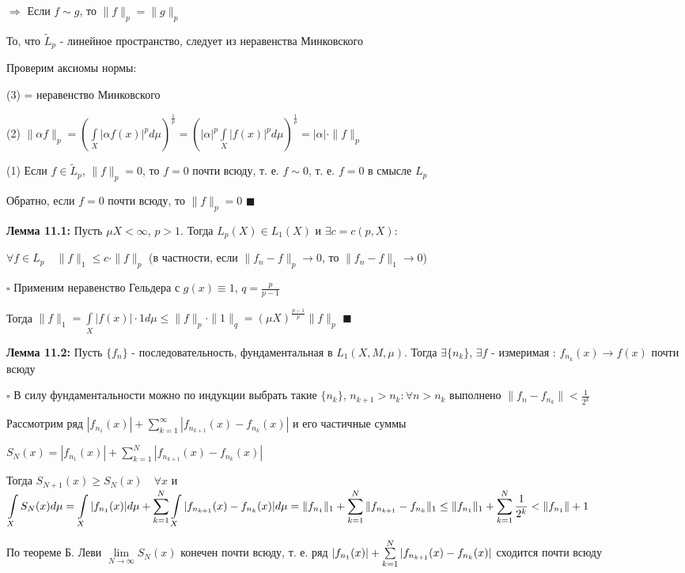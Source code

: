 \documentclass[a4paper]{report}
\newcommand*{\hm}[1]{#1\nobreak\discretionary{}%
            {\hbox{$\mathsurround=0pt #1$}}{}}
\begin{document}
$\Rightarrow$ Если $f\sim g$, то $\|f\|_p=\|g\|_p$

То, что $\tilde L_p$ - линейное пространство, следует из неравенства Минковского

Проверим аксиомы нормы:

(3) = неравенство Минковского

(2) $\|\alpha f\|_p=\left(\displaystyle\int\limits_X|\alpha f(x)|^pd\mu\right)^\frac1p=\left(|\alpha|^p\displaystyle\int\limits_X|f(x)|^pd\mu\right)^\frac1p=|\alpha|
\cdot\|f\|_p$

(1) Если $f\in\tilde L_p$, $\|f\|_p=0$, то $f=0$ почти всюду, т. е. $f\sim0$, т. е. $f=0$ в смысле $L_p$

Обратно, если $f=0$ почти всюду, то $\|f\|_p=0$ $\blacksquare$
\bigskip

\noindent\textbf{Лемма 11.1:} Пусть $\mu X<\infty$, $p>1$. Тогда $L_p(X)\in L_1(X)$ и $\exists c=c(p,X)\colon$

\noindent$\forall f\in L_p\quad\|f\|_1\le c\cdot\|f\|_p$ (в частности, если $\|f_n-f\|_p\to0$, то $\|f_n-f\|_1\to0$)

\noindent $\square$ Применим неравенство Гельдера с $g(x)\equiv1$, $q=\frac{p}{p-1}$

Тогда $\|f\|_1=\displaystyle\int\limits_X|f(x)|\cdot 1d\mu\le\|f\|_p\cdot\|1\|_q=(\mu X)^\frac{p-1}{p}\|f\|_p$ $\blacksquare$
\bigskip

\noindent\textbf{Лемма 11.2:} Пусть $\{f_n\}$ - последовательность, фундаментальная в $L_1(X,M,\mu)$. Тогда $\exists \{n_k\}$, $\exists f$ - измеримая : $f_{n_k}(x)\to f(x)$ почти всюду

\noindent $\square$ В силу фундаментальности можно по индукции выбрать такие $\{n_k\}$, $n_{k+1}>n_k\colon\forall n>n_k$ выполнено $\|f_n-f_{n_k}\|<\frac1{2^k}$

Рассмотрим ряд $|f_{n_1}(x)|+\sum\limits_{k=1}^\infty|f_{n_{k+1}}(x)-f_{n_k}(x)|$ и его частичные суммы

$S_N(x)=|f_{n_1}(x)|+\sum\limits_{k=1}^N|f_{n_{k+1}}(x)-f_{n_k}(x)|$

Тогда $S_{N+1}(x)\ge S_N(x)\quad\forall x$ и $\displaystyle\int\limits_X S_N(x)d\mu=\displaystyle\int\limits_X|f_{n_1}(x)|d\mu+\sum\limits_{k=1}^N\displaystyle\int\limits_X|f_{n_{k+1}}(x)\hm-f_{n_k}(x)|d\mu=\|f_{n_1}\|_1+\sum\limits_{k=1}^N\|f_{n_{k+1}}-f_{n_k}\|_1\le\|f_{n_1}\|_1+\sum\limits_{k=1}^N\frac1{2^k}<\|f_{n_1}\|+1$

По теореме Б. Леви $\lim\limits_{N\to\infty}S_N(x)$ конечен почти всюду, т. е. ряд $|f_{n_1}(x)|\hm+\sum\limits_{k=1}^N|f_{n_{k+1}}(x)-f_{n_k}(x)|$ сходится почти всюду
\end{document}
